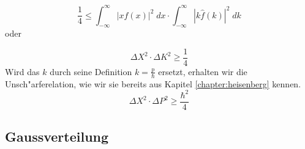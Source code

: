 \begin{refsection}
\begin{equation}
\frac{1}{4}\leq \int_{-\infty}^{\infty} \left| x f(x)\right|^{2}\; dx \cdot \int_{-\infty}^{\infty} \left| k \hat{f}(k)\right|^{2}\; dk
\end{equation}
oder

\begin{equation}
\varDelta X^{2}\cdot\varDelta K^{2}\geq\frac{1}{4}
\end{equation}
Wird das $k$ durch seine Definition $k = \frac{p}{\hbar}$ ersetzt, erhalten wir die Unsch"arferelation, wie wir sie bereits aus Kapitel \ref{chapter:heisenberg} kennen.
\begin{equation}
\varDelta X^{2}\cdot\varDelta P^{2}\geq\frac{\hbar^{2}}{4}
\label{equation:ort_impuls_unschaerfe}
\end{equation}

\subsection{Gaussverteilung}


\end{refsection}
